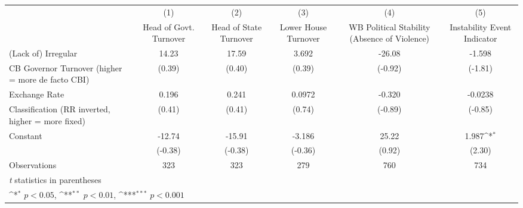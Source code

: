 {
\def\sym#1{\ifmmode^{#1}\else\(^{#1}\)\fi}
\begin{tabular}{l*{5}{c}}
\hline\hline
                    &\multicolumn{1}{c}{(1)}&\multicolumn{1}{c}{(2)}&\multicolumn{1}{c}{(3)}&\multicolumn{1}{c}{(4)}&\multicolumn{1}{c}{(5)}\\
                    &\multicolumn{1}{c}{Head of Govt. Turnover}&\multicolumn{1}{c}{Head of State Turnover}&\multicolumn{1}{c}{Lower House Turnover}&\multicolumn{1}{c}{WB Political Stability (Absence of Violence)}&\multicolumn{1}{c}{Instability Event Indicator}\\
\hline
(Lack of) Irregular &       14.23         &       17.59         &       3.692         &      -26.08         &      -1.598         \\
CB Governor Turnover (higher = more de facto CBI)&      (0.39)         &      (0.40)         &      (0.39)         &     (-0.92)         &     (-1.81)         \\
[1em]
Exchange Rate       &       0.196         &       0.241         &      0.0972         &      -0.320         &     -0.0238         \\
Classification (RR inverted, higher = more fixed)&      (0.41)         &      (0.41)         &      (0.74)         &     (-0.89)         &     (-0.85)         \\
[1em]
Constant            &      -12.74         &      -15.91         &      -3.186         &       25.22         &       1.987\sym{*}  \\
                    &     (-0.38)         &     (-0.38)         &     (-0.36)         &      (0.92)         &      (2.30)         \\
\hline
Observations        &         323         &         323         &         279         &         760         &         734         \\
\hline\hline
\multicolumn{6}{l}{\footnotesize \textit{t} statistics in parentheses}\\
\multicolumn{6}{l}{\footnotesize \sym{*} \(p<0.05\), \sym{**} \(p<0.01\), \sym{***} \(p<0.001\)}\\
\end{tabular}
}
